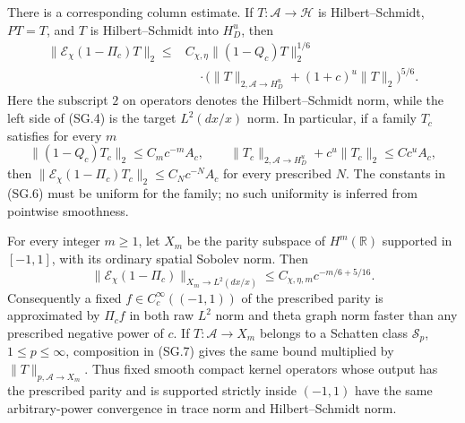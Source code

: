 \begin{theorem}
There is a corresponding column estimate.  If
$T:\mathcal A\to\mathcal H$ is Hilbert--Schmidt,
$PT=T$, and $T$ is Hilbert--Schmidt into $H_D^u$, then
\[
 \begin{split}
 \|\mathcal E_\chi(1-\Pi_c)T\|_2
 \leq{}&C_{\chi,\eta}
              \|(1-Q_c)T\|_2^{1/6}\\
 &\quad\cdot
 \bigl(\|T\|_{2,\mathcal A\to H_D^u}
                     +(1+c)^u\|T\|_2\bigr)^{5/6}.
 \end{split}                                        \tag{SG.5}
\]
Here the subscript $2$ on operators denotes the
Hilbert--Schmidt norm, while the left side of (SG.4)
is the target $L^2(dx/x)$ norm.
In particular, if a family $T_c$ satisfies for every $m$
\[
 \|(1-Q_c)T_c\|_2\leq C_m c^{-m}A_c,
 \qquad
 \|T_c\|_{2,\mathcal A\to H_D^u}
                 +c^u\|T_c\|_2\leq Cc^u A_c,
                                                               \tag{SG.6}
\]
then $\|\mathcal E_\chi(1-\Pi_c)T_c\|_2
\leq C_Nc^{-N}A_c$ for every prescribed $N$.
The constants in (SG.6) must be uniform for the family;
no such uniformity is inferred from pointwise smoothness.

For every integer $m\geq1$, let $X_m$ be the parity
subspace of $H^m(\mathbb R)$ supported in $[-1,1]$,
with its ordinary spatial Sobolev norm.  Then
\[
 \|\mathcal E_\chi(1-\Pi_c)\|_{X_m\to L^2(dx/x)}
                \leq C_{\chi,\eta,m}
                         c^{-m/6+5/16}.             \tag{SG.7}
\]
Consequently a fixed $f\in C_c^\infty((-1,1))$ of the
prescribed parity is approximated by $\Pi_cf$ in
both raw $L^2$ norm and theta graph norm faster than
any prescribed negative power of $c$.
If $T:\mathcal A\to X_m$ belongs to a Schatten class
$\mathcal S_p$, $1\leq p\leq\infty$, composition in
(SG.7) gives the same bound multiplied by
$\|T\|_{p,\mathcal A\to X_m}$.
Thus fixed smooth compact kernel operators whose output
has the prescribed parity and is supported strictly inside
$(-1,1)$ have the same arbitrary-power convergence in
trace norm and Hilbert--Schmidt norm.
\end{theorem}
